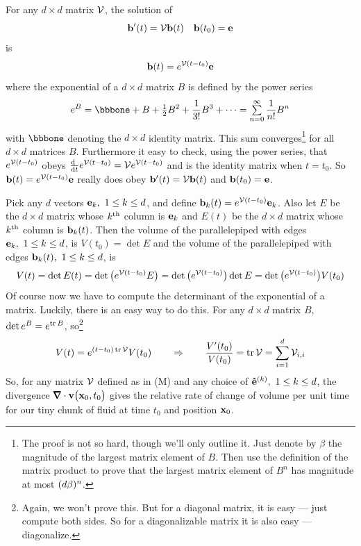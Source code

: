 \begin{eg}
             \label{eg:flowExpandC}
For any $d\times d$ matrix  $\mathcal{V}$, the solution of 
\begin{equation*}
\mathbf{b}'(t)=\mathcal{V}\mathbf{b}(t)\quad \mathbf{b}(t_0)=\mathbf{e}
\end{equation*}
is
\begin{equation*}
\mathbf{b}(t)=e^{\mathcal{V} (t-t_0)}\mathbf{e}
\end{equation*}
where the exponential of a $d\times d$ matrix $B$ is defined by
the power series
\begin{equation*}
e^B=\bbbone+B+\half B^2+\frac{1}{3!}B^3+\cdots=\smsum_{n=0}^\infty \frac{1}{n!}B^n
\end{equation*}
with $\bbbone$ denoting the $d\times d$ identity matrix.
This sum converges\footnote{The proof is not so hard, though we'll only
outline it. Just denote by $\beta$ the magnitude of the largest matrix 
element of $B$.  Then use the definition of the matrix product to prove that
the largest matrix element of $B^n$ has magnitude at most $(d\beta)^n$.} 
for all $d\times d$ matrices $B$. Furthermore it easy
to check, using the power series, that $e^{\mathcal{V} (t-t_0)}$ 
obeys $\diff{\hfill}{t}e^{\cV (t-t_0)}=\cV e^{\cV (t-t_0)}$ 
and is the identity matrix when $t=t_0$. So 
$\mathbf{b}(t)=e^{\mathcal{V} (t-t_0)}\mathbf{e}$ really does obey 
$\mathbf{b}'(t)=\mathcal{V}\mathbf{b}(t)$ and $\mathbf{b}(t_0)=\mathbf{e}$. 

Pick any $d$ vectors $\mathbf{e}_k,\ 1\le k\le d$, and 
define $\mathbf{b}_k(t)=e^{\mathcal{V} (t-t_0)}\mathbf{e}_k$. Also let $E$ be the $d\times d$ matrix
whose $k^{\rm th}$ column is $\mathbf{e}_k$ and $E(t)$  be the $d\times d$ matrix
whose $k^{\rm th}$ column is $\mathbf{b}_k(t)$. Then the volume of the parallelepiped
with edges $\mathbf{e}_k,\ 1\le k\le d$, is $V(t_0)=\det E$ and the volume of the 
parallelepiped with edges $\mathbf{b}_k(t),\ 1\le k\le d$, is 
\begin{equation*}
V(t)=\det E(t)=\det\big(e^{\mathcal{V} (t-t_0)}E\big)
=\det\big(e^{\mathcal{V} (t-t_0)}\big)\det E
=\det\big(e^{\mathcal{V} (t-t_0)}\big)V(t_0)
\end{equation*}
Of course now we have to compute the determinant of the exponential of a matrix.
Luckily, there is an easy way to do this.
For any $d\times d$ matrix $B$, $\det e^B=e^{\mathop{\rm tr} B}$, so\footnote{Again, we won't prove this. But for a diagonal matrix, it is easy --- just compute
both sides. So for a diagonalizable matrix it is also easy --- diagonalize.} 
\begin{equation*}
V(t)=e^{(t-t_0)\mathop{\rm tr} \mathcal{V} }V(t_0)\qquad\Rightarrow\qquad
\frac{V'(t_0)}{V(t_0)}=\mathop{\rm tr} \mathcal{V}=\sum_{i=1}^d \mathcal{V}_{i,i}
\end{equation*}
So, for any matrix $\mathcal{V}$ defined as in (M)  and any choice of 
$\mathbf{\hat e}^{(k)},\ 1\le k\le d$, the divergence 
$\vnabla\cdot\vv\big(\vx_0,t_0\big)$ gives the relative rate of change
of volume per unit time for our tiny chunk of fluid at time $t_0$ and position
$\mathbf{x}_0$.
\end{eg}

